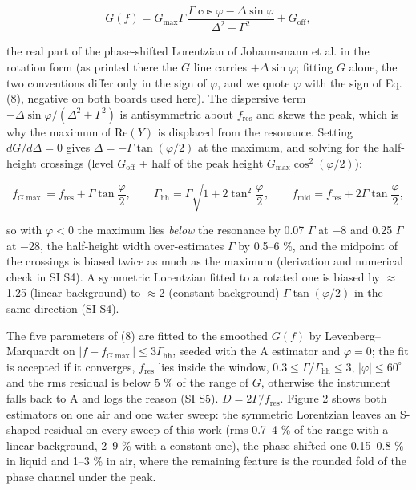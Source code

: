\documentclass[11pt,a4paper]{article}
\begin{document}
\begin{equation}\tag{8}
G(f) = G_\mathrm{max}\Gamma\,\frac{\Gamma\cos\varphi - \Delta\sin\varphi}{\Delta^2 + \Gamma^2} + G_\mathrm{off},
\end{equation}

the real part of the phase-shifted Lorentzian of Johannsmann et al. \citep[Eq. 13]{Johannsmann2021} in the rotation form (as printed there the $G$ line carries $+\Delta\sin\varphi$; fitting $G$ alone, the two conventions differ only in the sign of $\varphi$, and we quote $\varphi$ with the sign of Eq. (8), negative on both boards used here). The dispersive term $-\Delta\sin\varphi/(\Delta^2 + \Gamma^2)$ is antisymmetric about $f_\mathrm{res}$ and skews the peak, which is why the maximum of $\mathrm{Re}(Y)$ is displaced from the resonance. Setting $dG/d\Delta = 0$ gives $\Delta = -\Gamma\tan(\varphi/2)$ at the maximum, and solving for the half-height crossings (level $G_\mathrm{off}$ + half of the peak height $G_\mathrm{max}\cos^2(\varphi/2)$):

\begin{equation}\tag{9}
f_{G\max} = f_\mathrm{res} + \Gamma\tan\frac{\varphi}{2},\qquad \Gamma_\mathrm{hh} = \Gamma\sqrt{1 + 2\tan^2\frac{\varphi}{2}},\qquad f_\mathrm{mid} = f_\mathrm{res} + 2\Gamma\tan\frac{\varphi}{2},
\end{equation}

so with $\varphi < 0$ the maximum lies \emph{below} the resonance by 0.07 $\Gamma$ at $-$8\textdegree{} and 0.25 $\Gamma$ at $-$28\textdegree{}, the half-height width over-estimates $\Gamma$ by 0.5--6 \%, and the midpoint of the crossings is biased twice as much as the maximum (derivation and numerical check in SI S4). A symmetric Lorentzian fitted to a rotated one is biased by $\approx$1.25 (linear background) to $\approx$2 (constant background) $\Gamma\tan(\varphi/2)$ in the same direction (SI S4).

The five parameters of (8) are fitted to the smoothed $G(f)$ by Levenberg--Marquardt on $|f - f_{G\max}| \le 3\Gamma_\mathrm{hh}$, seeded with the A estimator and $\varphi = 0$; the fit is accepted if it converges, $f_\mathrm{res}$ lies inside the window, $0.3 \le \Gamma/\Gamma_\mathrm{hh} \le 3$, $|\varphi| \le 60^\circ$ and the rms residual is below 5 \% of the range of $G$, otherwise the instrument falls back to A and logs the reason (SI S5). $D = 2\Gamma/f_\mathrm{res}$. Figure 2 shows both estimators on one air and one water sweep: the symmetric Lorentzian leaves an S-shaped residual on every sweep of this work (rms 0.7--4 \% of the range with a linear background, 2--9 \% with a constant one), the phase-shifted one 0.15--0.8 \% in liquid and 1--3 \% in air, where the remaining feature is the rounded fold of the phase channel under the peak.
\end{document}
